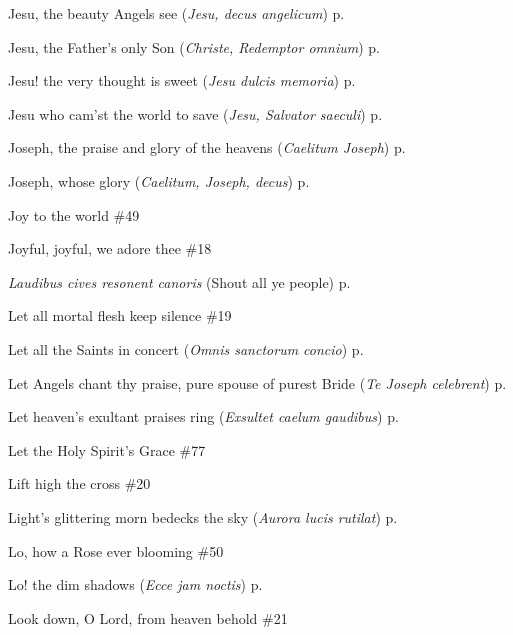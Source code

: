 \begin{hangparas}{1.25em}{1}
\par\noindent
Jesu, the beauty Angels see (\textit{Jesu, decus angelicum}) \dotfill p. \pageref{HolyNameMattins}
\par\noindent
Jesu, the Father's only Son (\textit{Christe, Redemptor omnium}) \dotfill p. \pageref{ChristmasEvensong}
\par\noindent
Jesu! the very thought is sweet (\textit{Jesu dulcis memoria}) \dotfill p. \pageref{HolyNameEvensong}
\par\noindent
Jesu who cam'st the world to save (\textit{Jesu, Salvator saeculi}) \dotfill p. \pageref{AllHallowsMattins}
\par\noindent
Joseph, the praise and glory of the heavens (\textit{Caelitum Joseph}) \dotfill p. \pageref{PatronageMattins}
\par\noindent
Joseph, whose glory (\textit{Caelitum, Joseph, decus}) \dotfill p. \pageref{JosephInvitatory}
\par\noindent
Joy to the world \dotfill \#49
\par\noindent
Joyful, joyful, we adore thee \dotfill \#18
\par\noindent
\textit{Laudibus cives resonent canoris} (Shout all ye people) \dotfill p. \pageref{BenedictEvensong}
\par\noindent
Let all mortal flesh keep silence \dotfill \#19
\par\noindent
Let all the Saints in concert (\textit{Omnis sanctorum concio}) \dotfill p. \pageref{AnneEvensongII}
\par\noindent
Let Angels chant thy praise, pure spouse of purest Bride (\textit{Te Joseph celebrent}) \dotfill p. \pageref{PatronageEvensong}
\par\noindent
Let heaven's exultant praises ring (\textit{Exsultet caelum gaudibus}) \dotfill p. \pageref{JohnMattins}
\par\noindent
Let the Holy Spirit's Grace \dotfill \#77
\par\noindent
Lift high the cross \dotfill \#20
\par\noindent
Light's glittering morn bedecks the sky (\textit{Aurora lucis rutilat}) \dotfill p. \pageref{EasterMattins}
\par\noindent
Lo, how a Rose ever blooming \dotfill \#50
\par\noindent
Lo! the dim shadows (\textit{Ecce jam noctis}) \dotfill p. \pageref{SundayMattinsSummer}
\par\noindent
Look down, O Lord, from heaven behold \dotfill \#21
\par\noindent

\end{hangparas}

